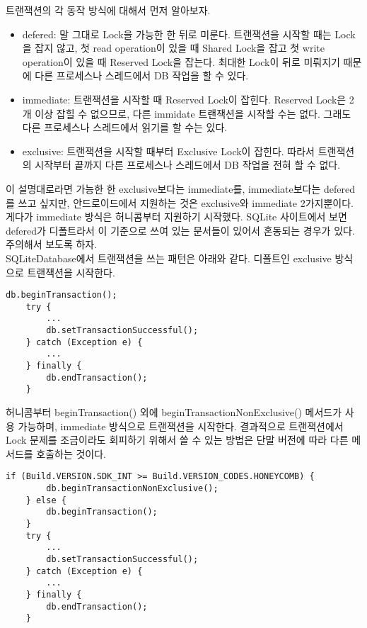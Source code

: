 트랜잭션의 각 동작 방식에 대해서 먼저 알아보자.
\begin{itemize}
\item defered: 말 그대로 Lock을 가능한 한 뒤로 미룬다. 트랜잭션을 시작할 때는 Lock을 잡지 않고, 첫 read operation이 있을 때 Shared Lock을 잡고 첫 write operation이 있을 때 Reserved Lock을 잡는다. 
최대한 Lock이 뒤로 미뤄지기 때문에 다른 프로세스나 스레드에서 DB 작업을 할 수 있다. 

\item immediate: 트랜잭션을 시작할 때 Reserved Lock이 잡힌다. Reserved Lock은 2개 이상 잡힐 수 없으므로, 다른 immidate 트랜잭션을 시작할 수는 없다. 
그래도 다른 프로세스나 스레드에서 읽기를 할 수는 있다.

\item exclusive: 트랜잭션을 시작할 때부터 Exclusive Lock이 잡힌다. 따라서 트랜잭션의 시작부터 끝까지 다른 프로세스나 스레드에서 DB 작업을 전혀 할 수 없다.
\end{itemize}

이 설명대로라면 가능한 한 exclusive보다는 immediate를, immediate보다는 defered를 쓰고 싶지만, 
안드로이드에서 지원하는 것은 exclusive와 immediate 2가지뿐이다. 게다가 immediate 방식은 허니콤부터 지원하기 시작했다.
SQLite 사이트에서 보면 defered가 디폴트라서 이 기준으로 쓰여 있는 문서들이 있어서 혼동되는 경우가 있다. 주의해서 보도록 하자.\\

SQLiteDatabase에서 트랜잭션을 쓰는 패턴은 아래와 같다. 
디폴트인 exclusive 방식으로 트랜잭션을 시작한다.
\begin{lstlisting}[frame=single] 
	db.beginTransaction();
   	try {
     	...
     	db.setTransactionSuccessful();
	} catch (Exception e) {
		...
   	} finally {
     	db.endTransaction();
   	}
\end{lstlisting}

허니콤부터 beginTransaction() 외에 beginTransactionNonExclusive() 메서드가 사용 가능하며, immediate 방식으로 트랜잭션을 시작한다.
결과적으로 트랜잭션에서 Lock 문제를 조금이라도 회피하기 위해서 쓸 수 있는 방법은 단말 버전에 따라 다른 메서드를 호출하는 것이다.
\begin{lstlisting}[frame=single] 
	if (Build.VERSION.SDK_INT >= Build.VERSION_CODES.HONEYCOMB) {
		db.beginTransactionNonExclusive();
	} else {
		db.beginTransaction();
	}
   	try {
     	...
     	db.setTransactionSuccessful();
	} catch (Exception e) {
		...
   	} finally {
     	db.endTransaction();
   	}
\end{lstlisting}

